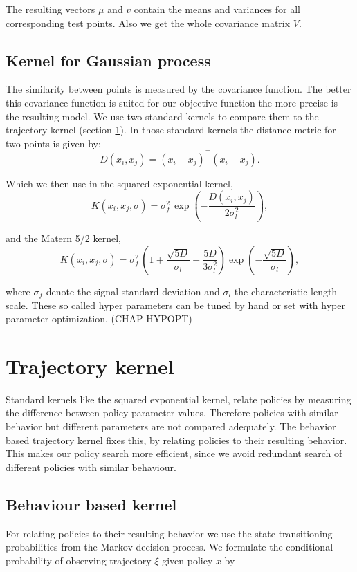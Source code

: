 The resulting vectors $\mu$ and $v$ contain the means and variances for all corresponding test points. Also we get the whole covariance matrix $V$.

\subsection{Kernel for Gaussian process}
The similarity between points is measured by the covariance function. The better this covariance function is suited for our objective function the more precise is the resulting model.
We use two standard kernels to compare them to the trajectory kernel (section \ref{sec:trajKernel}). In those standard kernels the distance metric for two points is given by:
$$D(x_i,x_j) = (x_i-x_j)^\top (x_i-x_j).$$

Which we then use in the squared exponential kernel,
$$K(x_i,x_j,\sigma) = \sigma_{f}^{2}\,\exp\left(-\frac{D(x_i,x_j)}{2\sigma_l^2} \right), $$

and the Matern 5/2 kernel,
$$K(x_i,x_j,\sigma) = \sigma_{f}^{2}\,\left(1 + \frac{\sqrt{5 D}}{\sigma_l} + \frac{5 D}{3\sigma_l^2} \right) \exp\left(-\frac{\sqrt{5 D}}{\sigma_l} \right),$$

where $\sigma_f$ denote the signal standard deviation and $\sigma_l$ the characteristic length scale. These so called hyper parameters can be tuned by hand or set with hyper parameter optimization. (CHAP HYPOPT)

\section{Trajectory kernel}\label{sec:trajKernel}

Standard kernels like the squared exponential kernel, relate policies by measuring the difference between policy parameter values. Therefore policies with similar behavior but different parameters are not compared adequately. The behavior based trajectory kernel fixes this, by relating policies to their resulting behavior. This makes our policy search more efficient, since we avoid redundant search of different policies with similar behaviour.

\subsection{Behaviour based kernel}

For relating policies to their resulting behavior we use the state transitioning probabilities from the Markov decision process. We formulate the conditional probability of observing trajectory $\xi$ given policy $x$ by

